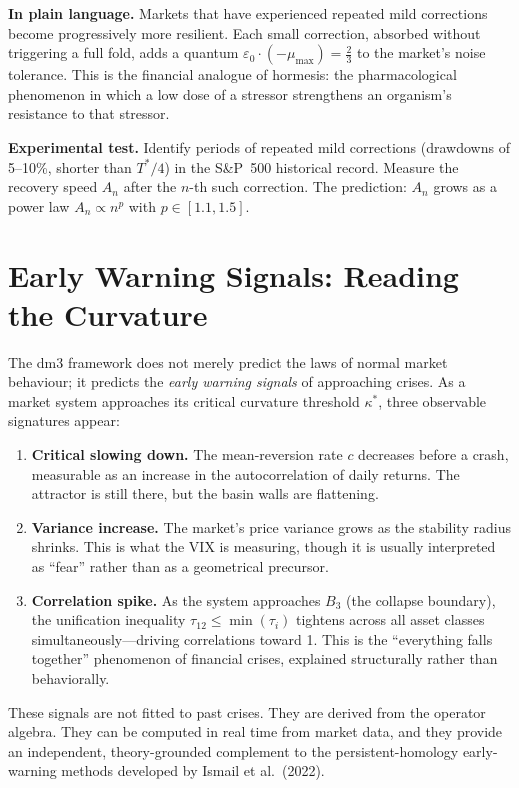 \documentclass[12pt, oneside]{book}
\theoremstyle{plain}
\theoremstyle{definition}
\theoremstyle{remark}
\begin{document}
\textbf{In plain language.} Markets that have experienced repeated
mild corrections become progressively more resilient. Each small
correction, absorbed without triggering a full fold, adds a
quantum $\varepsilon_0 \cdot (-\mu_{\max}) = \frac{2}{3}$ to
the market's noise tolerance. This is the financial analogue
of hormesis: the pharmacological phenomenon in which a low dose
of a stressor strengthens an organism's resistance to that stressor.

\textbf{Experimental test.} Identify periods of repeated mild
corrections (drawdowns of 5--10\%, shorter than $T^*/4$) in
the S\&P~500 historical record. Measure the recovery speed
$A_n$ after the $n$-th such correction. The prediction: $A_n$
grows as a power law $A_n \propto n^p$ with $p \in [1.1, 1.5]$.

\section{Early Warning Signals: Reading the Curvature}

The dm3 framework does not merely predict the laws of normal
market behaviour; it predicts the \emph{early warning signals}
of approaching crises. As a market system approaches its critical
curvature threshold $\kappa^*$, three observable signatures appear:

\begin{enumerate}
  \item \textbf{Critical slowing down.} The mean-reversion rate
    $c$ decreases before a crash, measurable as an increase
    in the autocorrelation of daily returns. The attractor
    is still there, but the basin walls are flattening.
  \item \textbf{Variance increase.} The market's price variance
    grows as the stability radius shrinks. This is what the VIX
    is measuring, though it is usually interpreted as ``fear''
    rather than as a geometrical precursor.
  \item \textbf{Correlation spike.} As the system approaches
    $B_3$ (the collapse boundary), the unification inequality
    $\tau_{12} \leq \min(\tau_i)$ tightens across all asset
    classes simultaneously---driving correlations toward 1.
    This is the ``everything falls together'' phenomenon of
    financial crises, explained structurally rather than behaviorally.
\end{enumerate}

These signals are not fitted to past crises. They are derived
from the operator algebra. They can be computed in real time
from market data, and they provide an independent, theory-grounded
complement to the persistent-homology early-warning methods
developed by Ismail et al.\ (2022).
\end{document}
